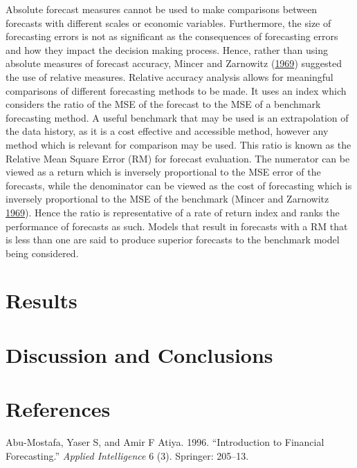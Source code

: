 \documentclass[12pt,preprint, authoryear]{elsarticle}
\numberwithin{equation}{section}
\numberwithin{figure}{section}
\numberwithin{table}{section}
\begin{document}
Absolute forecast measures cannot be used to make comparisons between
forecasts with different scales or economic variables. Furthermore, the
size of forecasting errors is not as significant as the consequences of
forecasting errors and how they impact the decision making process.
Hence, rather than using absolute measures of forecast accuracy, Mincer
and Zarnowitz (\protect\hyperlink{ref-mincer1969}{1969}) suggested the
use of relative measures. Relative accuracy analysis allows for
meaningful comparisons of different forecasting methods to be made. It
uses an index which considers the ratio of the MSE of the forecast to
the MSE of a benchmark forecasting method. A useful benchmark that may
be used is an extrapolation of the data history, as it is a cost
effective and accessible method, however any method which is relevant
for comparison may be used. This ratio is known as the Relative Mean
Square Error (RM) for forecast evaluation. The numerator can be viewed
as a return which is inversely proportional to the MSE error of the
forecasts, while the denominator can be viewed as the cost of
forecasting which is inversely proportional to the MSE of the benchmark
(Mincer and Zarnowitz \protect\hyperlink{ref-mincer1969}{1969}). Hence
the ratio is representative of a rate of return index and ranks the
performance of forecasts as such. Models that result in forecasts with a
RM that is less than one are said to produce superior forecasts to the
benchmark model being considered.

\section{\texorpdfstring{Results
\label{Results}}{Results }}\label{results}

\section{\texorpdfstring{Discussion and Conclusions
\label{Discussion and Conclusions}}{Discussion and Conclusions }}\label{discussion-and-conclusions}

\newpage

\section*{References}\label{references}

\hypertarget{refs}{}
\hypertarget{ref-abu1996}{}
Abu-Mostafa, Yaser S, and Amir F Atiya. 1996. ``Introduction to
Financial Forecasting.'' \emph{Applied Intelligence} 6 (3). Springer:
205--13.
\end{document}
